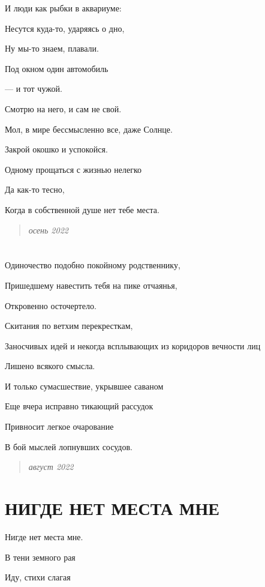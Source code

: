 \documentclass[
  a5paperpaper,
  DIV=11,
  numbers=noendperiod]{scrreprt}
\begin{document}
И люди как рыбки в аквариуме:

Несутся куда-то, ударяясь о дно,

Ну мы-то знаем, плавали.

Под окном один автомобиль

--- и тот чужой.

Смотрю на него, и сам не свой.

Мол, в мире бессмысленно все, даже Солнце.

Закрой окошко и успокойся.

Одному прощаться с жизнью нелегко

Да как-то тесно,

Когда в собственной душе нет тебе места.

\begin{quote}
\emph{осень 2022}
\end{quote}

\section{}\label{section-14}

Одиночество подобно покойному родственнику,

Пришедшему навестить тебя на пике отчаянья,

Откровенно осточертело.

Скитания по ветхим перекресткам,

Заносчивых идей и некогда всплывающих из коридоров вечности лиц

Лишено всякого смысла.

И только сумасшествие, укрывшее саваном

Еще вчера исправно тикающий рассудок

Привносит легкое очарование

В бой мыслей лопнувших сосудов.

\begin{quote}
\emph{август 2022}
\end{quote}

\section{НИГДЕ НЕТ МЕСТА
МНЕ}\label{ux43dux438ux433ux434ux435-ux43dux435ux442-ux43cux435ux441ux442ux430-ux43cux43dux435}

Нигде нет места мне.

В тени земного рая

Иду, стихи слагая
\end{document}
